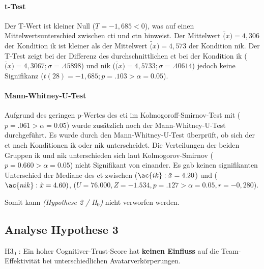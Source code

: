 \documentclass[a4paper,11pt]{article}%
\renewcommand{\\}{\vspace*{0.5\baselineskip} \newline}
\begin{document}
\paragraph{t-Test}
Der T-Wert ist kleiner Null ($T = -1,685 < 0$), was auf einen Mittelwertsunterschied zwischen \ac{cti} und \ac{ctn} hinweist. Der Mittelwert $\bar(x) = 4,306$ der Kondition \ac{ik} ist kleiner als der Mittelwert $\bar(x) = 4,573$ der Kondition \ac{nik}.
Der T-Test zeigt bei der Differenz des durchschnittlichen \ac{ct} bei der Kondition \ac{ik} ($\bar(x) = 4,3067; \sigma = .45898$) und \ac{nik} ($\bar(x) = 4,5733; \sigma =.40614$) jedoch keine Signifikanz ($t(28) = -1,685; p = .103 > \alpha = 0.05$).

\paragraph{Mann-Whitney-U-Test}
Aufgrund des geringen p-Wertes des \ac{cti} im Kolmogoroff-Smirnov-Test mit ($p = .061 > \alpha = 0.05$) wurde zusätzlich noch der Mann-Whitney-U-Test durchgeführt.
Es wurde durch den Mann-Whitney-U-Test überprüft, ob sich der \ac{ct} nach Konditionen \ac{ik} oder \ac{nik} unterscheidet. Die Verteilungen der beiden Gruppen \ac{ik} und \ac{nik} unterschieden sich  laut Kolmogorov-Smirnov ($p = 0.660 > \alpha = 0.05$) nicht Signifikant von einander. Es gab keinen signifikanten Unterschied der Mediane des \ac{ct} zwischen ($\ac{ik} : \tilde x = 4.20$) und ($\ac{nik} : \tilde x = 4.60)$, ($U = 76.000, Z = -1.534, p = .127 > \alpha = 0.05, r =-0,280$). \\

Somit kann \textit{(Hypothese 2 / H$_{0}$)} nicht verworfen werden.

\newpage
\subsection{Analyse Hypothese 3}
H3$_{0}$ : Ein hoher Cognitiver-Trust-Score hat \textbf{keinen Einfluss} auf die Team-Effektivität bei unterschiedlichen Avatarverkörperungen.
\end{document}
